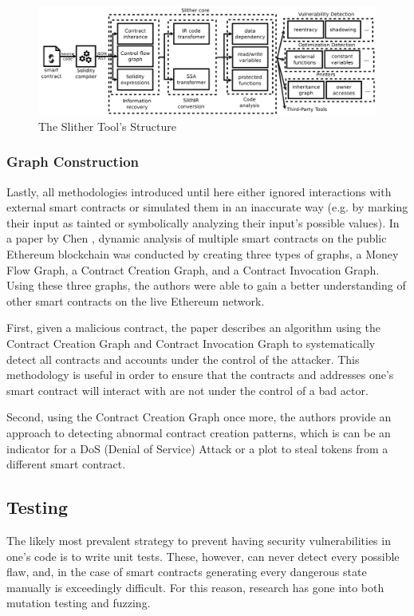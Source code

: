 \documentclass[letterpaper,twocolumn,10pt]{article}
\begin{document}
\begin{figure}
\begin{center}
\includegraphics[scale=0.15]{Slither}
\end{center}
\caption{\label{fig:slither} The Slither Tool's Structure}
\end{figure}


\subsubsection{Graph Construction}
Lastly, all methodologies introduced until here either ignored interactions with external smart contracts or simulated them in an inaccurate way (e.g. by marking their input as tainted or symbolically analyzing their input's possible values). In a paper by Chen \cite{chen_zhu_li_chen_li_luo_lin_zhange_2018}, dynamic analysis of multiple smart contracts on the public Ethereum blockchain was conducted by creating three types of graphs, a Money Flow Graph, a Contract Creation Graph, and a Contract Invocation Graph. Using these three graphs, the authors were able to gain a better understanding of other smart contracts on the live Ethereum network. 

\noindent First, given a malicious contract, the paper describes an algorithm using the Contract Creation Graph and Contract Invocation Graph to systematically detect all contracts and accounts under the control of the attacker. This methodology is useful in order to ensure that the contracts and addresses one's smart contract will interact with are not under the control of a bad actor.

\noindent Second, using the Contract Creation Graph once more, the authors provide an approach to detecting abnormal contract creation patterns, which is can be an indicator for a DoS (Denial of Service) Attack or a plot to steal tokens from a different smart contract. 


\subsection{Testing}
The likely most prevalent strategy to prevent having security vulnerabilities in one's code is to write unit tests. These, however, can never detect every possible flaw, and, in the case of smart contracts generating every dangerous state manually is exceedingly difficult. For this reason, research has gone into both mutation testing and fuzzing.
\end{document}
